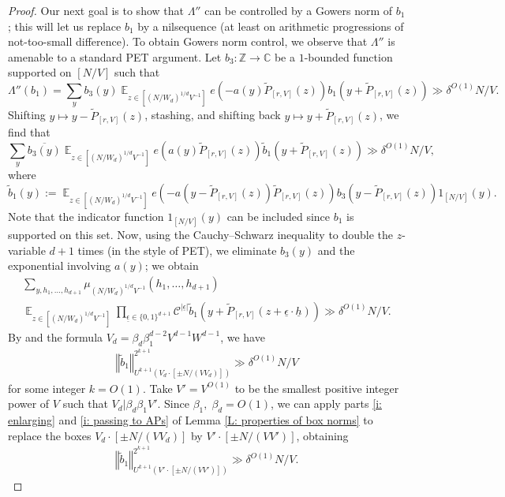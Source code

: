 \documentclass[11pt]{amsart}
\theoremstyle{definition}
\DeclareMathOperator*{\E}{\mathbb{E}}
\newcommand{\C}{{\mathbb C}}
\newcommand{\Z}{{\mathbb Z}}
\newcommand{\CC}{{\mathcal C}}
\newcommand{\uh}{{\underline{h}}}
\newcommand{\ueps}{{\underline{\epsilon}}}
\newcommand{\norm}[1]{\left\Vert #1\right\Vert}
\begin{document}
\begin{proof}
Our next goal is to show that $\Lambda''$ can be controlled by a Gowers norm of $b_1$; this will let us replace $b_1$ by a nilsequence (at least on arithmetic progressions of not-too-small difference). To obtain Gowers norm control, we observe that $\Lambda''$ is amenable to a standard PET argument.  Let $b_3:\Z\to\C$ be a $1$-bounded function supported on $[N/V]$ such that 
$$\Lambda''(b_1) = \sum_{y}b_3(y)\E_{z \in [(N/W_d)^{1/d}V^{-1}]} e(-a(y)\widetilde{P}_{[r,V]}(z))
b_1(y+ \widetilde{P}_{[r,V]}(z)) \gg \delta^{O(1)}N/V.$$
Shifting $y \mapsto y-\widetilde P_{[r,V]}(z)$, stashing, and shifting back $y \mapsto y+\widetilde P_{[r,V]}(z)$, we find that
$$\sum_{y}\overline{b_3(y)}\E_{z \in [(N/W_d)^{1/d}V^{-1}]} e(a(y)\widetilde{P}_{[r,V]}(z))
\widetilde b_1(y+ \widetilde{P}_{[r,V]}(z))\gg \delta^{O(1)}N/V,$$
where
$$\widetilde b_1(y):= \E_{z \in [(N/W_d)^{1/d}V^{-1}]} e(-a(y-\widetilde{P}_{[r,V]}(z))\widetilde{P}_{[r,V]}(z))
b_3(y-\widetilde{P}_{[r,V]}(z))1_{[N/V]}(y).$$ Note that the indicator function $1_{[N/V]}(y)$ can be included since $b_1$ is supported on this set. 
Now, using the Cauchy--Schwarz inequality to double the $z$-variable $d+1$ times (in the style of PET), we eliminate $b_3(y)$ and the exponential involving $a(y)$; we obtain
\begin{multline*}
    \sum_{y, h_1, \ldots, h_{d+1}}\mu_{(N/W_d)^{1/d}V^{-1}}(h_1, \ldots, h_{d+1})\\ \E_{z \in [(N/W_d)^{1/d}V^{-1}]} \prod_{\ueps\in\{0,1\}^{d+1}}\CC^{|\ueps|}\widetilde b_1(y + \widetilde{P}_{[r,V]}(z+\ueps\cdot\uh)) \gg \delta^{O(1)}N/V.
\end{multline*}
By \cite[Proposition 10.1]{KKL24a} and the formula $V_d = \beta_d \beta_1^{d-2}V^{d-1}W^{d-1}$, we have
\begin{align*}
    \norm{\widetilde b_1}_{U^{k+1}(V_d\cdot[\pm N/(VV_d)])}^{2^{k+1}}\gg \delta^{O(1)} N/V
\end{align*}
for some integer $k=O(1)$. Take $V'=V^{O(1)}$ to be the smallest positive integer power of $V$ such that $V_d|\beta_d \beta_1 V'$.
Since $\beta_1,\; \beta_d=O(1)$, we can apply parts \eqref{i: enlarging} and \eqref{i: passing to APs} of Lemma \ref{L: properties of box norms} to replace the boxes $V_d\cdot[\pm N/(VV_d)]$ by $V'\cdot[\pm N/(VV')]$, obtaining
\begin{align*}
    \norm{\widetilde b_1}_{U^{k+1}(V'\cdot[\pm N/(VV')])}^{2^{k+1}}\gg \delta^{O(1)} N/V.
\end{align*}


\end{proof}
\end{document}
